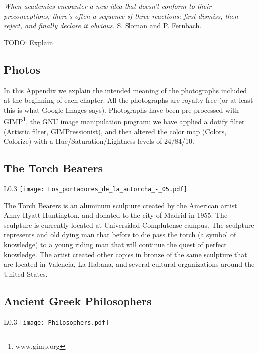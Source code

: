 \emph{When academics encounter a new idea that doesn’t conform to their preconceptions, there’s often a sequence of three reactions: first dismiss, then reject, and finally declare it obvious.} S. Sloman and P. Fernbach.

{\color{red} TODO: Explain}

%
%

\subsection{Photos}

In this Appendix we explain the intended meaning of the photographs included at the beginning of each chapter. All the photographs are royalty-free (or at least this is what Google Images says). Photographs have been pre-processed with GIMP\footnote {www.gimp.org}, the GNU image manipulation program: we have applied a dotify filter (Artistic filter, GIMPressionist), and then altered the color map (Colors, Colorize) with a Hue/Saturation/Lightness levels of 24/84/10.

\subsection* {The Torch Bearers}

\begin{wrapfigure}{L}{0.3\textwidth}
\centering
\texttt{[image: Los\_portadores\_de\_la\_antorcha\_-\_05.pdf]}
\end{wrapfigure}

The Torch Bearers is an aluminum sculpture created by the American artist Anny Hyatt Huntington, and donated to the city of Madrid in 1955. The sculpture is currently located at Universidad Complutense campus. The sculpture represents and old dying man that before to die pass the torch (a symbol of knowledge) to a young riding man that will continue the quest of perfect knowledge. The artist created other copies in bronze of the same sculpture that are located in Valencia, La Habana, and several cultural organizations around the United States.

\subsection* {Ancient Greek Philosophers}

\begin{wrapfigure}{L}{0.3\textwidth}
\centering
\texttt{[image: Philosophers.pdf]}
\end{wrapfigure}

